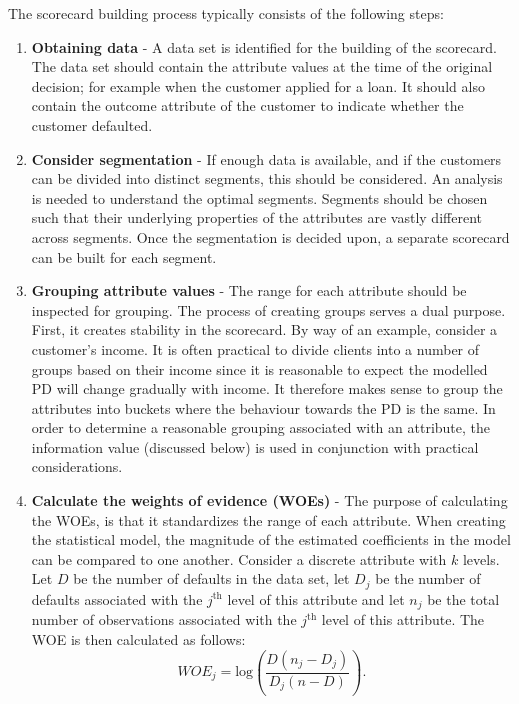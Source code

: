 \documentclass{article}
\theoremstyle{def}
\begin{document}
The scorecard building process typically consists of the following steps:
\begin{enumerate}
    \item \textbf{Obtaining data} - A data set is identified for the building of the scorecard. The data set should contain the attribute values at the time of the original decision; for example when the customer applied for a loan. It should also contain the outcome attribute of the customer to indicate whether the customer defaulted.
    \item \textbf{Consider segmentation} - If enough data is available, and if the customers can be divided into distinct segments, this should be considered. An analysis is needed to understand the optimal segments. Segments should be chosen such that their underlying properties of the attributes are vastly different across segments. Once the segmentation is decided upon, a separate scorecard can be built for each segment.
    \item \textbf{Grouping attribute values} - The range for each attribute should be inspected for grouping. The process of creating groups serves a dual purpose. First, it creates stability in the scorecard. By way of an example, consider a customer's income. It is often practical to divide clients into a number of groups based on their income since it is reasonable to expect the modelled PD will change gradually with income. It therefore makes sense to group the attributes into buckets where the behaviour towards the PD is the same. In order to determine a reasonable grouping associated with an attribute, the information value (discussed below) is used in conjunction with practical considerations.
    \item \textbf{Calculate the weights of evidence (WOEs)} - The purpose of calculating the WOEs, is that it standardizes the range of each attribute. When creating the statistical model, the magnitude of the estimated coefficients in the model can be compared to one another. Consider a discrete attribute with $k$ levels. Let $D$ be the number of defaults in the data set, let $D_j$ be the number of defaults associated with the $j^{\textrm{th}}$ level of this attribute and let $n_j$ be the total number of observations associated with the $j^{\textrm{th}}$ level of this attribute. The WOE is then calculated as follows:
\begin{equation*}
    {WOE_j}=\textrm{log}\left(\frac{D(n_j-D_j)}{D_j(n-D)}\right).

\end{equation*}
\end{enumerate}
\end{document}

